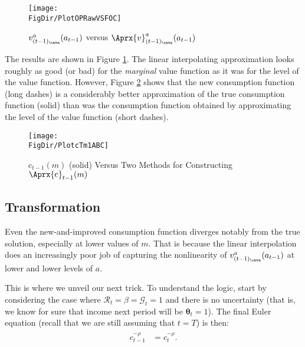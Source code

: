 \documentclass[titlepage, headings=optiontotocandhead]{Resources/texmf-local/tex/latex/econtex}
\begin{document}
\hypertarget{PlotOPRawVSFOC}{}
\begin{figure}
  \centerline{\texttt{[image: \\FigDir/PlotOPRawVSFOC]}}
  \caption{$v_{({t-1})_\cntn}^{a}(a_{t-1})$ versus $\Aprx{v}_{({t-1})_\cntn}^{a}(a_{t-1})$}
  \label{fig:PlotOPRawVSFOC}
\end{figure}


The results are shown in Figure \ref{fig:PlotOPRawVSFOC}.  The linear interpolating approximation looks roughly as good (or bad) for the \textit{marginal} value function as it was for the level of the value function. However, Figure \ref{fig:PlotcTm1ABC} shows that the new consumption function (long dashes) is a considerably better approximation of the true consumption function (solid) than was the consumption function obtained by approximating the level of the value function (short dashes).

\hypertarget{PlotcTm1ABC}{}
\begin{figure}
  \centerline{\texttt{[image: \\FigDir/PlotcTm1ABC]}}
  \caption{$\mathrm{c}_{t-1}(m)$ (solid) Versus Two Methods for Constructing $\Aprx{\mathrm{c}}_{t-1}(m)$}
  \label{fig:PlotcTm1ABC}
\end{figure}

\hypertarget{transformation}{}
\subsection{Transformation}\label{subsec:transformation}

Even the new-and-improved consumption function diverges notably from the true
solution, especially at lower values of $m$.  That is because the
linear interpolation does an increasingly poor job of capturing the
nonlinearity of $v_{({t-1})_\cntn}^{a}(a_{t-1})$ at
lower and lower levels of $a$.

This is where we unveil our next trick.  To understand the logic,
start by considering the case where $\mathcal{R}_{t} = \beta =
\mathcal{G}_{t} = 1$ and there is no uncertainty
(that is, we know for sure that income next period
will be $\pmb{\theta}_{t} = 1$).  The final Euler equation (recall that we are still assuming that $t=T$) is then:
\begin{equation}\begin{gathered}\begin{aligned}
      c_{t-1}^{-\rho}  & = c_{t}^{-\rho}.
    \end{aligned}\end{gathered}\end{equation}
\end{document}
